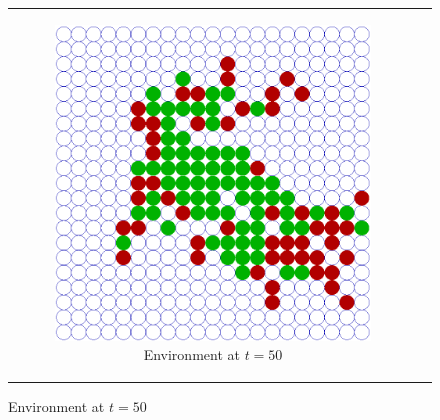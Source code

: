 \begin{figure}
\begin{center}
	\begin{tabular}{c c}
		\begin{subfigure}[b]{0.4\textwidth}
			\centering
			\includegraphics[width=1\textwidth, angle=0]{./fig/timedriven/SIR_Dunai/SIR_Dunai_dt001_environment.png}
			\caption{Environment at $t = 50$}
			\label{fig:sir_dunai_env}
		\end{subfigure}
    	
    	&
  

\end{tabular}
\end{center}
\end{figure}
